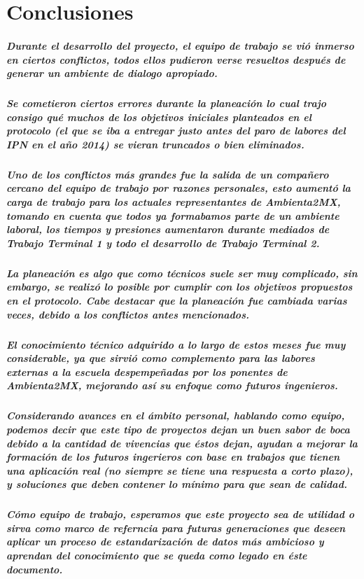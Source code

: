 \chapter {Conclusiones}
  \paragraph{Durante el desarrollo del proyecto, el equipo de trabajo se vió inmerso en ciertos conflictos, todos ellos pudieron verse resueltos después de generar un ambiente de dialogo apropiado.}
  \paragraph{Se cometieron ciertos errores durante la planeación lo cual trajo consigo qué muchos de los objetivos iniciales planteados en el protocolo (el que se iba a entregar justo antes del paro de labores del IPN en el año 2014) se vieran truncados o bien eliminados.}
  \paragraph{Uno de los conflictos más grandes fue la salida de un compañero cercano del equipo de trabajo por razones personales, esto aumentó la carga de trabajo para los actuales representantes de Ambienta2MX, tomando en cuenta que todos ya formabamos parte de un ambiente laboral, los tiempos y presiones aumentaron durante mediados de Trabajo Terminal 1 y todo el desarrollo de Trabajo Terminal 2.}
  \paragraph{La planeación es algo que como técnicos suele ser muy complicado, sin embargo, se realizó lo posible por cumplir con los objetivos propuestos en el protocolo. Cabe destacar que la planeación fue cambiada varias veces, debido a los conflictos antes mencionados.}
  \paragraph{El conocimiento técnico adquirido a lo largo de estos meses fue muy considerable, ya que sirvió como complemento para las labores externas a la escuela despempeñadas por los ponentes de Ambienta2MX, mejorando así su enfoque como futuros ingenieros.}
  \paragraph{Considerando avances en el ámbito personal, hablando como equipo, podemos decir que este tipo de proyectos dejan un buen sabor de boca debido a la cantidad de vivencias que éstos dejan, ayudan a mejorar la formación de los futuros ingerieros con base en trabajos que tienen una aplicación real (no siempre se tiene una respuesta a corto plazo), y soluciones que deben contener lo mínimo para que sean de calidad.}
  \paragraph{Cómo equipo de trabajo, esperamos que este proyecto sea de utilidad o sirva como marco de referncia para futuras generaciones que deseen aplicar un proceso de estandarización de datos más ambicioso y aprendan del conocimiento que se queda como legado en éste documento.}
